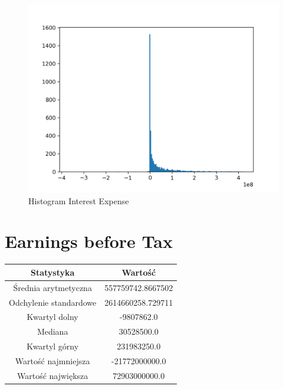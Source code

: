\documentclass{article}
\begin{document}
\begin{figure}[h!]
    \includegraphics[width=\linewidth]{variables/Interest Expense.png}
    \caption{Histogram Interest Expense }
\end{figure}\section{ Earnings before Tax }

\begin{center}
    \begin{tabular}{|c | c|} 
    \hline
    Statystyka & Wartość \\
    \hline\hline
    Średnia arytmetyczna & 557759742.8667502 \\ 
    \hline
    Odchylenie standardowe & 2614660258.729711 \\
    \hline
    Kwartyl dolny & -9807862.0 \\
    \hline
    Mediana & 30528500.0 \\
    \hline
    Kwartyl górny & 231983250.0 \\
    \hline
    Wartość najmniejsza & -21772000000.0 \\
    \hline
    Wartość największa & 72903000000.0 \\
    \hline
   \end{tabular}
\end{center}
\end{document}
